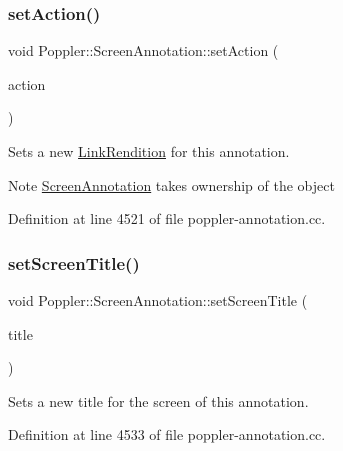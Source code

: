 \mbox{\label{class_poppler_1_1_screen_annotation_a1df5efe49b6f8f5333324cbef856519f}} 
\subsubsection{\texorpdfstring{set\+Action()}{setAction()}}
{\footnotesize\ttfamily void Poppler\+::\+Screen\+Annotation\+::set\+Action (\begin{DoxyParamCaption}\item[{\hyperlink{class_poppler_1_1_link_rendition}{Link\+Rendition} $\ast$}]{action }\end{DoxyParamCaption})}

Sets a new \hyperlink{class_poppler_1_1_link_rendition}{Link\+Rendition} for this annotation.

\begin{DoxyNote}{Note}
\hyperlink{class_poppler_1_1_screen_annotation}{Screen\+Annotation} takes ownership of the object 
\end{DoxyNote}


Definition at line 4521 of file poppler-\/annotation.\+cc.

\mbox{\label{class_poppler_1_1_screen_annotation_aa9169592f12287f9c7242bef0d31ae87}} 
\subsubsection{\texorpdfstring{set\+Screen\+Title()}{setScreenTitle()}}
{\footnotesize\ttfamily void Poppler\+::\+Screen\+Annotation\+::set\+Screen\+Title (\begin{DoxyParamCaption}\item[{const Q\+String \&}]{title }\end{DoxyParamCaption})}

Sets a new title for the screen of this annotation. 

Definition at line 4533 of file poppler-\/annotation.\+cc.

